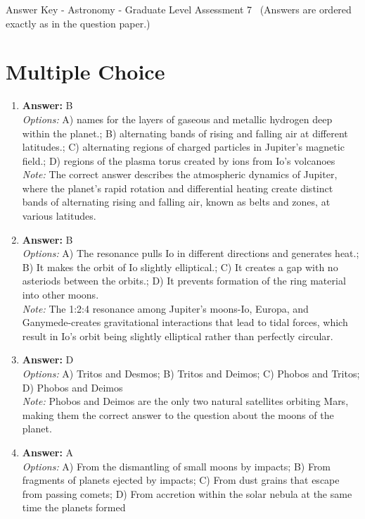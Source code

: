\documentclass[12pt]{article}
\begin{document}
\begin{center}
Answer Key - Astronomy - Graduate Level Assessment 7 \
\small (Answers are ordered exactly as in the question paper.)
\end{center}

\section*{Multiple Choice}
\begin{enumerate}[label=\arabic*.]
\item \textbf{Answer:} B
\\ \textit{Options:} A) names for the layers of gaseous and metallic hydrogen deep within the planet.; B) alternating bands of rising and falling air at different latitudes.; C) alternating regions of charged particles in Jupiter's magnetic field.; D) regions of the plasma torus created by ions from Io's volcanoes
\\ \textit{Note:} The correct answer describes the atmospheric dynamics of Jupiter, where the planet's rapid rotation and differential heating create distinct bands of alternating rising and falling air, known as belts and zones, at various latitudes.
\item \textbf{Answer:} B
\\ \textit{Options:} A) The resonance pulls Io in different directions and generates heat.; B) It makes the orbit of Io slightly elliptical.; C) It creates a gap with no asteriods between the orbits.; D) It prevents formation of the ring material into other moons.
\\ \textit{Note:} The 1:2:4 resonance among Jupiter's moons-Io, Europa, and Ganymede-creates gravitational interactions that lead to tidal forces, which result in Io's orbit being slightly elliptical rather than perfectly circular.
\item \textbf{Answer:} D
\\ \textit{Options:} A) Tritos and Desmos; B) Tritos and Deimos; C) Phobos and Tritos; D) Phobos and Deimos
\\ \textit{Note:} Phobos and Deimos are the only two natural satellites orbiting Mars, making them the correct answer to the question about the moons of the planet.
\item \textbf{Answer:} A
\\ \textit{Options:} A) From the dismantling of small moons by impacts; B) From fragments of planets ejected by impacts; C) From dust grains that escape from passing comets; D) From accretion within the solar nebula at the same time the planets formed

\end{enumerate}
\end{document}
